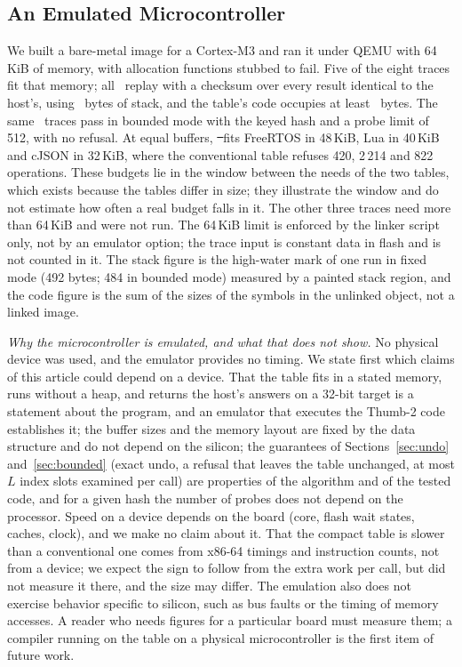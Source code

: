\subsection{An Emulated Microcontroller}
\label{sec:mcu}
We built a bare-metal image for a Cortex-M3 and ran it under QEMU with 64\,KiB of memory, with allocation functions stubbed to fail. Five of the eight traces fit that memory; all \EmbPass\ replay with a checksum over every result identical to the host's, using \EmbStack\ bytes of stack, and the table's code occupies at least \EmbCode\ bytes. The same \EmbBoundedPass\ traces pass in bounded mode with the keyed hash and a probe limit of 512, with no refusal. At equal buffers, \st\ fits FreeRTOS in 48\,KiB, Lua in 40\,KiB and cJSON in 32\,KiB, where the conventional table refuses 420, 2\,214 and 822 operations. These budgets lie in the window between the needs of the two tables, which exists because the tables differ in size; they illustrate the window and do not estimate how often a real budget falls in it. The other three traces need more than 64\,KiB and were not run. The 64\,KiB limit is enforced by the linker script only, not by an emulator option; the trace input is constant data in flash and is not counted in it. The stack figure is the high-water mark of one run in fixed mode (492 bytes; 484 in bounded mode) measured by a painted stack region, and the code figure is the sum of the sizes of the  symbols in the unlinked object, not a linked image.

\emph{Why the microcontroller is emulated, and what that does not show.} No physical device was used, and the emulator provides no timing. We state first which claims of this article could depend on a device. That the table fits in a stated memory, runs without a heap, and returns the host's answers on a 32-bit target is a statement about the program, and an emulator that executes the Thumb-2 code establishes it; the buffer sizes and the memory layout are fixed by the data structure and do not depend on the silicon; the guarantees of Sections~\ref{sec:undo} and~\ref{sec:bounded} (exact undo, a refusal that leaves the table unchanged, at most $L$ index slots examined per call) are properties of the algorithm and of the tested code, and for a given hash the number of probes does not depend on the processor. Speed on a device depends on the board (core, flash wait states, caches, clock), and we make no claim about it. That the compact table is slower than a conventional one comes from x86-64 timings and instruction counts, not from a device; we expect the sign to follow from the extra work per call, but did not measure it there, and the size may differ. The emulation also does not exercise behavior specific to silicon, such as bus faults or the timing of memory accesses. A reader who needs figures for a particular board must measure them; a compiler running on the table on a physical microcontroller is the first item of future work.

